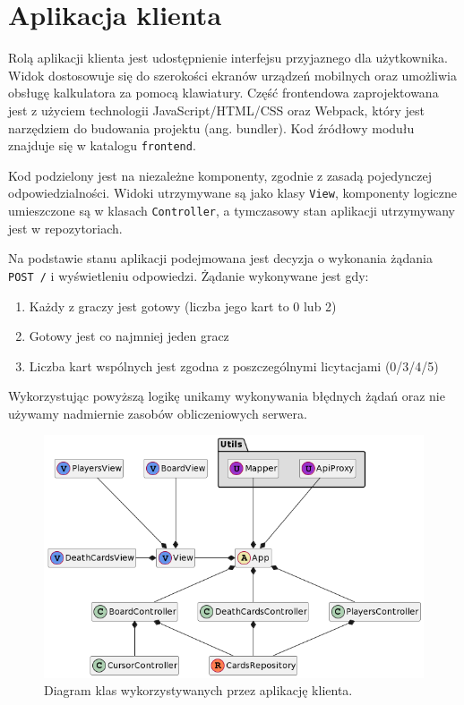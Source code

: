 \clearpage

\section{Aplikacja klienta}

Rolą aplikacji klienta jest udostępnienie interfejsu przyjaznego dla użytkownika. Widok dostosowuje się do szerokości ekranów urządzeń mobilnych oraz umożliwia obsługę kalkulatora za pomocą klawiatury. Część frontendowa zaprojektowana jest z użyciem technologii JavaScript/HTML/CSS oraz Webpack, który jest narzędziem do budowania projektu (ang. bundler). Kod źródłowy modułu znajduje się w katalogu \verb+frontend+.

Kod podzielony jest na niezależne komponenty, zgodnie z zasadą pojedynczej odpowiedzialności. Widoki utrzymywane są jako klasy \verb+View+, komponenty logiczne umieszczone są w klasach \verb+Controller+, a tymczasowy stan aplikacji utrzymywany jest w repozytoriach. 

Na podstawie stanu aplikacji podejmowana jest decyzja o wykonania żądania \verb+POST /+ i wyświetleniu odpowiedzi. Żądanie wykonywane jest gdy:
\begin{enumerate}
    \item Każdy z graczy jest gotowy (liczba jego kart to 0 lub 2)
    \item Gotowy jest co najmniej jeden gracz
    \item Liczba kart wspólnych jest zgodna z poszczególnymi licytacjami (0/3/4/5)
\end{enumerate}

Wykorzystując powyższą logikę unikamy wykonywania błędnych żądań oraz nie używamy nadmiernie zasobów obliczeniowych serwera.

\begin{figure}[hb]
    \includegraphics[width=\textwidth]{plantuml/out/frontened-class-diagram.png}
    \caption{Diagram klas wykorzystywanych przez aplikację klienta. }
    \label{fig:frontened-class-diagram}
\end{figure}